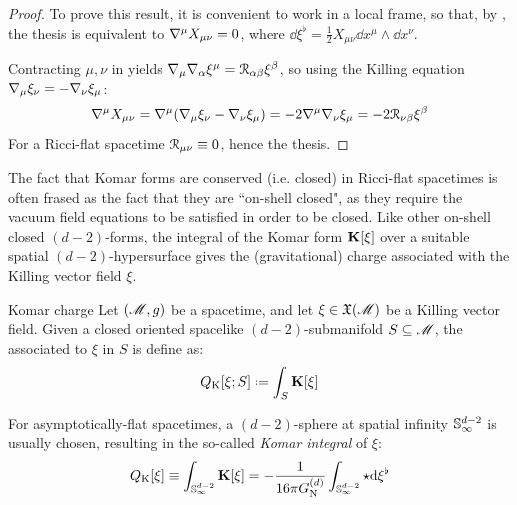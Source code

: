 \begin{proofbox}
  \begin{proof}
    To prove this result, it is convenient to work in a local frame, so that, by , the thesis is equivalent to $ \nabla^\mu X_{\mu \nu} = 0 $, where $ \dd \xi^\flat = \frac{1}{2} X_{\mu \nu} \dd x^\mu \wedge \dd x^\nu $.

    Contracting $ \mu , \nu $ in  yields $ \nabla_\mu \nabla_\alpha \xi^\mu = \EuScript{R}_{\alpha \beta} \xi^\beta $, so using the Killing equation $ \nabla_{\mu} \xi_\nu = - \nabla_\nu \xi_\mu $:
    \begin{equation*}
      \nabla^\mu X_{\mu \nu} = \nabla^\mu (\nabla_\mu \xi_\nu - \nabla_\nu \xi_\mu) = - 2 \nabla^\mu \nabla_\nu \xi_\mu = -2 \EuScript{R}_{\nu \beta} \xi^\beta
    \end{equation*}
    For a Ricci-flat spacetime $ \EuScript{R}_{\mu \nu} \equiv 0 $, hence the thesis.
  \end{proof}
\end{proofbox}

The fact that Komar forms are conserved (i.e. closed) in Ricci-flat spacetimes is often frased as the fact that they are ``on-shell closed", as they require the vacuum field equations to be satisfied in order to be closed.
Like other on-shell closed $ (d-2) $-forms, the integral of the Komar form $ \mathbf{K}[\xi] $ over a suitable spatial $ (d-2) $-hypersurface gives the (gravitational) charge associated with the Killing vector field $ \xi $.

\begin{definition}{Komar charge}{}
  Let $ (\mathscr{M} , g) $ be a spacetime, and let $ \xi \in \mathfrak{X}(\mathscr{M}) $ be a Killing vector field. Given a closed oriented spacelike $ (d-2) $-submanifold $ S \subseteq \mathscr{M} $, the  associated to $ \xi $ in $ S $ is define as:
  \begin{equation}
    Q_\text{K}[\xi ; S] \defeq \int_S \ve{K}[\xi]
    \label{eq:komar-charge-s}
  \end{equation}
\end{definition}

For asymptotically-flat spacetimes, a $ (d-2) $-sphere at spatial infinity $ \mathbb{S}^{d-2}_\infty $ is usually chosen, resulting in the so-called \emph{Komar integral} of $ \xi $:
\begin{equation}
  Q_\text{K}[\xi] \equiv \int_{\mathbb{S}^{d-2}_\infty} \mathbf{K}[\xi] = - \frac{1}{16 \pi G_\text{N}^{(d)}} \int_{\mathbb{S}^{d-2}_\infty} \star \mathrm{d} \xi^\flat
  \label{eq:komar-charge}
\end{equation}

